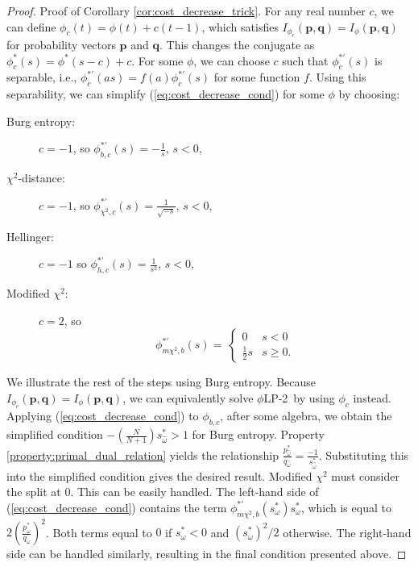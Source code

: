 \documentclass[opre,nonblindrev]{informs3} %
\newcommand{\q}{\mathbf{q}}
\newcommand{\p}{\mathbf{p}}
\newcommand{\plp}{$\phi$LP-2}
\begin{document}
\begin{proof}{\sc Proof of Corollary \ref{cor:cost_decrease_trick}.}
	For any real number $c$, we can define $\phi_c(t) = \phi(t) + c(t-1)$, which satisfies $I_{\phi_c}(\p,\q) = I_\phi(\p,\q)$ for probability vectors $\p$ and $\q$.
	This changes the conjugate as $\phi_c^*(s) = \phi^*(s-c) + c$.
	For some $\phi$, we can choose $c$ such that $\phi_c^{*\prime}(s)$ is separable, i.e., $\phi_c^{*\prime}(as) = f(a) \phi_c^{*\prime}(s)$ for some function $f$.
	Using this separability, we can simplify (\ref{eq:cost_decrease_cond}) for some $\phi$ by choosing:\vspace*{-0.15in}
	\begin{multicols}{2}
	\begin{description} 
		\item[Burg entropy:]  $c = -1$, so $\phi^{*\prime}_{b,c}(s) = -\frac{1}{s}$,  $s<0$,
		\item[$\chi^2$-distance:] $c = -1$, so $\phi^{*\prime}_{\chi^2, c}(s) = \frac{1}{\sqrt{-s}}$, $s<0$,
		\item[Hellinger:]  $c = -1$ so $\phi^{*\prime}_{h,c}(s) = \frac{1}{s^2}$,  $s<0$,
		\item[Modified $\chi^2$:] $c = 2$, so
		\[
			\phi^{*\prime}_{m\chi^2, b}(s) = \
			\begin{cases}
				0 					&  s < 0 \\
				\frac{1}{2} s 	&  s \geq 0.
			\end{cases}
		\]
	\end{description}
	\end{multicols}
	\noindent We illustrate the rest of the steps using Burg entropy. 
	Because $I_{\phi_c}(\p,\q) = I_\phi(\p,\q)$, we can equivalently solve \plp\ by using $\phi_c$ instead. 
	Applying (\ref{eq:cost_decrease_cond}) to $\phi_{b,c}$, after some algebra, we obtain the simplified condition $- \left( \frac{N}{N+1} \right)s_{\hat{\omega}}^* >1$ for Burg entropy. 
	Property \ref{property:primal_dual_relation} yields the relationship $\frac{p^*_{\hat{\omega}}}{q_{\hat{\omega}}}=\frac{-1}{s_{\hat{\omega}}^*}$. 
	Substituting this into the simplified condition gives the desired result. 
	Modified $\chi^{2}$ must consider the split at $0$. 
	This can be easily handled. 
	The left-hand side of (\ref{eq:cost_decrease_cond}) contains the term  $\phi^{*\prime}_{m\chi^2, b}(s_{\omega}^*)s_{\omega}^*$, which is equal to $2\left(\frac{p_{\omega}^*}{q_\omega}\right)^2$.  
	Both terms equal to $0$ if $s_{\omega}^* < 0$ and $(s_{\omega}^*)^2/2$ otherwise.  
	The right-hand side can be handled similarly, resulting in the final condition presented above. 
	\Halmos
\end{proof}
\end{document}
